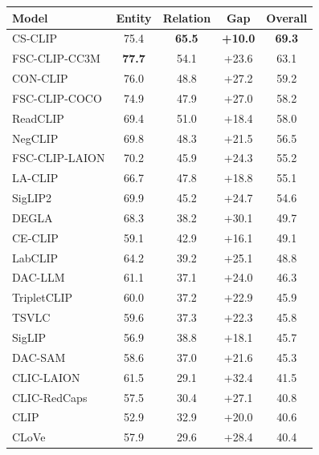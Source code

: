 \begin{tabular}{@{}lcccc@{}}
\toprule
\textbf{Model} & \textbf{Entity} & \textbf{Relation} & \textbf{Gap} & \textbf{Overall} \\
\midrule
CS-CLIP & 75.4 & \textbf{65.5} & \textbf{+10.0} & \textbf{69.3} \\
FSC-CLIP-CC3M & \textbf{77.7} & 54.1 & +23.6 & 63.1 \\
CON-CLIP & 76.0 & 48.8 & +27.2 & 59.2 \\
FSC-CLIP-COCO & 74.9 & 47.9 & +27.0 & 58.2 \\
ReadCLIP & 69.4 & 51.0 & +18.4 & 58.0 \\
NegCLIP & 69.8 & 48.3 & +21.5 & 56.5 \\
FSC-CLIP-LAION & 70.2 & 45.9 & +24.3 & 55.2 \\
LA-CLIP & 66.7 & 47.8 & +18.8 & 55.1 \\
SigLIP2 & 69.9 & 45.2 & +24.7 & 54.6 \\
DEGLA & 68.3 & 38.2 & +30.1 & 49.7 \\
CE-CLIP & 59.1 & 42.9 & +16.1 & 49.1 \\
LabCLIP & 64.2 & 39.2 & +25.1 & 48.8 \\
DAC-LLM & 61.1 & 37.1 & +24.0 & 46.3 \\
TripletCLIP & 60.0 & 37.2 & +22.9 & 45.9 \\
TSVLC & 59.6 & 37.3 & +22.3 & 45.8 \\
SigLIP & 56.9 & 38.8 & +18.1 & 45.7 \\
DAC-SAM & 58.6 & 37.0 & +21.6 & 45.3 \\
CLIC-LAION & 61.5 & 29.1 & +32.4 & 41.5 \\
CLIC-RedCaps & 57.5 & 30.4 & +27.1 & 40.8 \\
CLIP & 52.9 & 32.9 & +20.0 & 40.6 \\
CLoVe & 57.9 & 29.6 & +28.4 & 40.4 \\
\bottomrule
\end{tabular}